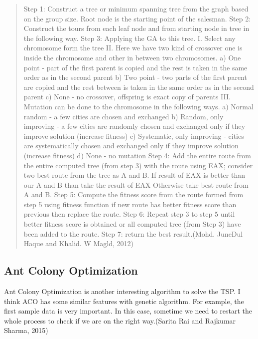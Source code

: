 \documentclass[a4paper,man,natbib]{apa6}
\begin{document}
\begin{quotation}
	Step 1: Construct a tree or minimum spanning tree from the
	graph based on the group size. Root node is the starting point of
	the salesman.
	\newline
	Step 2: Construct the tours from each leaf node and from
	starting node in tree in the following way.
	\newline
	Step 3: Applying the GA to this tree.
	I. Select any chromosome form the tree
	II. Here we have two kind of crossover one is inside the
	chromosome and other in between two chromosomes.
	a) One point - part of the first parent is copied and the
	rest is taken in the same order as in the second parent
	b) Two point - two parts of the first parent are copied
	and the rest between is taken in the same order as in the
	second parent
	c) None - no crossover, offspring is exact copy of
	parents
	III. Mutation can be done to the chromosome in the
	following ways.
	a) Normal random - a few cities are chosen and
	exchanged
	b) Random, only improving - a few cities are randomly
	chosen and exchanged only if they improve solution (increase
	fitness)
	c) Systematic, only improving - cities are systematically
	chosen and exchanged only if they improve solution (increase
	fitness)
	d) None - no mutation
	\newline
	Step 4: Add the entire route from the entire computed tree
	(from step 3) with the route using EAX; consider two best
	route from the tree as A and B. If result of EAX is better than
	our A and B than take the result of EAX Otherwise take best
	route from A and B.
	\newline
	Step 5: Compute the fitness score from the route formed
	from step 5 using fitness function if new route has better fitness
	score than previous then replace the route.
	\newline
	Step 6: Repeat step 3 to step 5 until better fitness score is
	obtained or all computed tree (from Step 3) have been added to
	the route.
	\newline
	Step 7: return the best result.(Mohd. JuneDul Haque and Khalid. W Magld, 2012)
\end{quotation}

\subsection{Ant Colony Optimization}
Ant Colony Optimization is another interesting algorithm to solve the TSP. I think ACO has some similar features with genetic algorithm. For example, the first sample data is very important. In this case, sometime we need to restart the whole process to check if we are on the right way.(Sarita Rai and Rajkumar Sharma, 2015)
\end{document}
